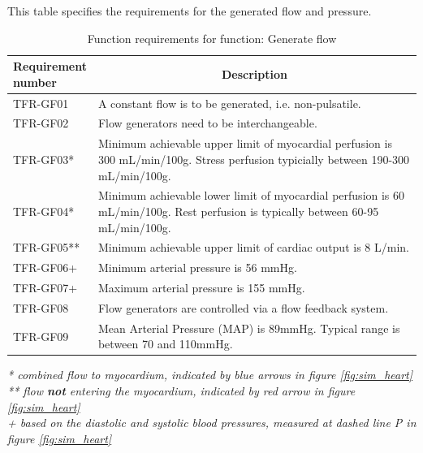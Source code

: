 \begin{table} [H]
\caption{Function requirements for function: Generate flow}
\label{tab:funcreq_tec}
This table specifies the requirements for the generated flow and pressure.
\begin{tabular}{l|p{120mm}|}
	\makecell[l]{\textbf{Requirement} \\  \textbf{number}} & \multicolumn{1}{c}{\textbf{Description}}\\
	\hline
	TFR-GF01 & A constant flow is to be generated, i.e. non-pulsatile. \\
	TFR-GF02 & Flow generators need to be interchangeable. \\
	TFR-GF03* & Minimum achievable upper limit of myocardial perfusion is 300 mL/min/100g. Stress perfusion typicially between 190-300 mL/min/100g. \\
	TFR-GF04* & Minimum achievable lower limit of myocardial perfusion is 60 mL/min/100g. Rest perfusion is typically between 60-95 mL/min/100g. \\
	TFR-GF05** & Minimum achievable upper limit of cardiac output is 8 L/min.\\
	TFR-GF06+ & Minimum arterial pressure is 56 mmHg. \\
	TFR-GF07+ & Maximum arterial pressure is  155 mmHg. \\
	TFR-GF08 & Flow generators are controlled via a flow feedback system. \\
	TFR-GF09 & Mean Arterial Pressure (MAP) \footnotemark is 89mmHg. Typical range is between 70 and 110mmHg.\\
	\cline{2-2}
\end{tabular}
\raggedright
\textit{* combined flow to myocardium, indicated by blue arrows in figure \ref{fig:sim_heart} }\\
\textit{** flow \textbf{not} entering the myocardium, indicated by red arrow in figure \ref{fig:sim_heart}} \\
\textit{+ based on the diastolic and systolic blood pressures, measured at dashed line P in figure \ref{fig:sim_heart}} \\
\end{table}


